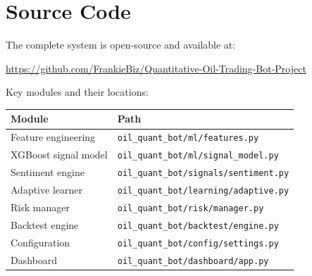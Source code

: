 \documentclass[12pt,a4paper]{article}
\begin{document}
\section{Source Code}
\label{app:code}

The complete system is open-source and available at:

\begin{center}
\url{https://github.com/FrankieBiz/Quantitative-Oil-Trading-Bot-Project}
\end{center}

Key modules and their locations:

\begin{table}[h!]
\centering
\begin{tabular}{@{}ll@{}}
\toprule
\textbf{Module} & \textbf{Path} \\
\midrule
Feature engineering & \texttt{oil\_quant\_bot/ml/features.py} \\
XGBoost signal model & \texttt{oil\_quant\_bot/ml/signal\_model.py} \\
Sentiment engine & \texttt{oil\_quant\_bot/signals/sentiment.py} \\
Adaptive learner & \texttt{oil\_quant\_bot/learning/adaptive.py} \\
Risk manager & \texttt{oil\_quant\_bot/risk/manager.py} \\
Backtest engine & \texttt{oil\_quant\_bot/backtest/engine.py} \\
Configuration & \texttt{oil\_quant\_bot/config/settings.py} \\
Dashboard & \texttt{oil\_quant\_bot/dashboard/app.py} \\
\bottomrule
\end{tabular}
\end{table}
\end{document}
